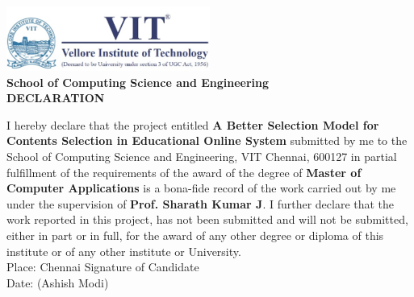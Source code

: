 %
\vspace*{\fill}
\begin{center}
%
%
%
\includegraphics[width=0.50\textwidth] {logo.png}\\
%

%
{\large \bf School of Computing Science and Engineering}\\ [1.5cm]
%
{\Large \bf DECLARATION}\\[0.75cm]
%
\end{center}

I hereby declare that the project entitled 
{\bf A Better Selection Model for Contents Selection in Educational Online System} 
submitted by me to the School of Computing Science and Engineering, VIT Chennai, 600127 
in partial fulfillment of the requirements of the award of the degree of {\bf Master of Computer Applications} 
is a bona-fide record of the work  
carried out by me under the supervision of {\bf Prof. Sharath Kumar J}. 
I further declare that 
the work reported in this project, has not been submitted and will not be submitted,
either in part or in full, for the award of any other degree or diploma of this
institute or of any other institute or University.
\\ [0.1cm]
%

%
%

\vspace{1.0 cm}
\noindent Place: Chennai \hfill Signature of Candidate \\
\noindent Date:  \hfill (Ashish Modi)\\[5.0cm]


\vspace*{\fill}
%
%  




